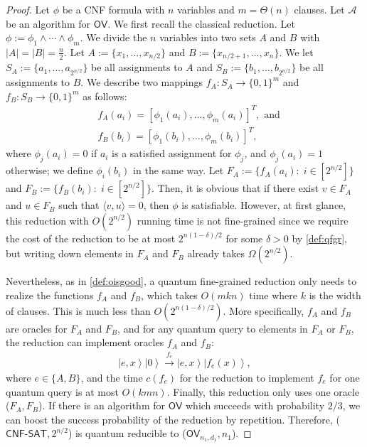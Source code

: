 \documentclass[10pt,a4paper]{article}
\newcommand{\ket}[1]{\left| #1 \right\rangle}
\newcommand{\OV}{\ensuremath{\mathsf{OV}}}
\begin{document}
\begin{proof}
Let $\phi$ be a CNF formula with $n$ variables and $m=\Theta(n)$ clauses. Let $\mathcal{A}$ be an algorithm for $\OV$. We first recall the classical reduction. Let $\phi := \phi_1\wedge \cdots \wedge\phi_m$. 
We divide the $n$ variables into two sets $A$ and $B$ with $|A| = |B| = \frac{n}{2}$. Let $A:=\{x_1,\dots,x_{n/2}\}$ and $B:= \{x_{n/2+1},\dots,x_{n}\}$. We let $S_A:=\{a_1,\dots,a_{2^{n/2}}\}$ be all assignments to $A$ and $S_B:=\{b_1,\dots,b_{2^{n/2}}\}$ be all assignments to $B$. We describe two mappings $f_A: S_A\rightarrow \{0,1\}^m$ and $f_B:S_B\rightarrow \{0,1\}^m$ as follows: 
\begin{align}
    &f_A(a_i) = [\phi_1(a_i),\dots,\phi_m(a_i)]^T, \text{ and}\\
    &f_B(b_i) = [\phi_1(b_i),\dots,\phi_m(b_i)]^T,
\end{align}
where $\phi_j(a_i) = 0$ if $a_i$ is a satisfied assignment for $\phi_j$, and  $\phi_j(a_i) = 1$ otherwise; we define $\phi_i(b_i)$ in the same way. Let $F_A:= \{f_A(a_i):\; i\in[2^{n/2}]\}$ and $F_B:= \{f_B(b_i):\; i\in[2^{n/2}]\}$. Then, it is obvious that if there exist $v\in F_A$ and $u\in F_B$ such that $\langle v, u \rangle=0$, then $\phi$ is satisfiable. However, at first glance, this reduction with $O(2^{n/2})$ running time is not fine-grained since we require the cost of the reduction to be at most $2^{n(1-\delta)/2}$ for some $\delta>0$ by \cref{def:qfgr}, but writing down elements in $F_A$ and $F_B$ already takes $\Omega(2^{n/2})$. %

Nevertheless, as in \cref{def:oisgood}, a quantum fine-grained reduction only needs to realize the functions $f_A$ and $f_B$, which takes $O(mkn)$ time where $k$ is the width of clauses. This is much less than $O(2^{n(1-\delta)/2})$. More specifically,  $f_A$ and $f_B$ are oracles for $F_A$ and $F_B$, and for any quantum query to elements in $F_A$ or $F_B$, the reduction can implement oracles $f_A$ and $f_B$:   
\begin{align}
    \ket{e,x}\ket{0}\xrightarrow{f_e} \ket{e,x}\ket{f_e(x)},
\end{align}
where $e\in \{A,B\}$, and the time $c(f_e)$ for the reduction to implement $f_e$ for one quantum query is at most $O(kmn)$. Finally, this reduction only uses one oracle ($F_A,F_B$). If there is an algorithm for $\OV$ which succeeds with probability $2/3$, we can boost the success probability of the reduction by repetition.  Therefore, ($\textsf{CNF-SAT},2^{n/2}$) is quantum reducible to ($\textsf{OV}_{n_1,d_1},n_1$). 
\end{proof}
\end{document}
